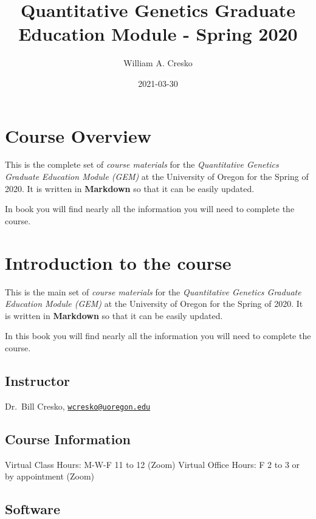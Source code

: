 \documentclass[
]{book}
\title{Quantitative Genetics Graduate Education Module - Spring 2020}
\author{William A. Cresko}
\date{2021-03-30}
\begin{document}
\maketitle

{
\setcounter{tocdepth}{1}
\tableofcontents
}
\hypertarget{course-overview}{%
\chapter{Course Overview}\label{course-overview}}

This is the complete set of \emph{course materials} for the \emph{Quantitative Genetics Graduate Education Module (GEM)} at the University of Oregon for the Spring of 2020. It is written in \textbf{Markdown} so that it can be easily updated.

In book you will find nearly all the information you will need to complete the course.

\hypertarget{introduction-to-the-course}{%
\chapter{Introduction to the course}\label{introduction-to-the-course}}

This is the main set of \emph{course materials} for the \emph{Quantitative Genetics Graduate Education Module (GEM)} at the University of Oregon for the Spring of 2020. It is written in \textbf{Markdown} so that it can be easily updated.

In this book you will find nearly all the information you will need to complete the course.

\hypertarget{instructor}{%
\section{Instructor}\label{instructor}}

Dr.~Bill Cresko, \href{mailto:wcresko@uoregon.edu}{\nolinkurl{wcresko@uoregon.edu}}

\hypertarget{course-information}{%
\section{Course Information}\label{course-information}}

Virtual Class Hours: M-W-F 11 to 12 (Zoom)
Virtual Office Hours: F 2 to 3 or by appointment (Zoom)

\hypertarget{software}{%
\section{Software}\label{software}}
\end{document}
